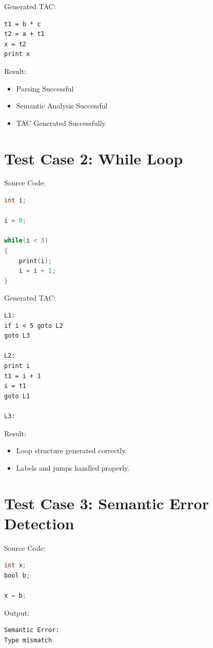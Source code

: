 \documentclass[12pt,a4paper]{report}
\begin{document}
Generated TAC:

\begin{lstlisting}
t1 = b * c
t2 = a + t1
x = t2
print x
\end{lstlisting}

Result:

\begin{itemize}
    \item Parsing Successful
    \item Semantic Analysis Successful
    \item TAC Generated Successfully
\end{itemize}

\section{Test Case 2: While Loop}

Source Code:

\begin{lstlisting}[language=C]
int i;

i = 0;

while(i < 5)
{
    print(i);
    i = i + 1;
}
\end{lstlisting}

Generated TAC:

\begin{lstlisting}
L1:
if i < 5 goto L2
goto L3

L2:
print i
t1 = i + 1
i = t1
goto L1

L3:
\end{lstlisting}

Result:

\begin{itemize}
    \item Loop structure generated correctly.
    \item Labels and jumps handled properly.
\end{itemize}

\section{Test Case 3: Semantic Error Detection}

Source Code:

\begin{lstlisting}[language=C]
int x;
bool b;

x = b;
\end{lstlisting}

Output:

\begin{lstlisting}
Semantic Error:
Type mismatch
\end{lstlisting}
\end{document}
